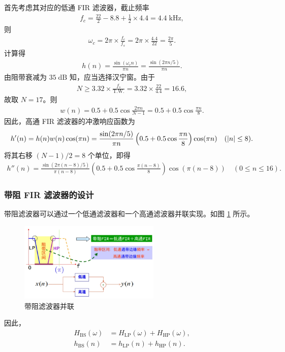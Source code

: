 \begin{solution}
    首先考虑其对应的低通 FIR 滤波器，截止频率
    \begin{align*}
        f_c = \frac{22}{2} - 8.8 + \frac{1}{2} \times 4.4 = 4.4\;\mathrm{kHz},
    \end{align*}
    则
    \begin{align*}
        \omega_c = 2\pi \times \frac{f_c}{f_s} = 2\pi \times \frac{4.4}{22} = \frac{2\pi}{5}.
    \end{align*}
    计算得
    \begin{align*}
        h(n) = \frac{\sin(\omega_c n)}{\pi n} = \frac{\sin(2\pi n / 5)}{\pi n}.
    \end{align*}
    由阻带衰减为 $35\;\mathrm{dB}$ 知，应当选择汉宁窗。由于
    \begin{align*}
        N \ge 3.32 \times \frac{f_s}{\text{T.W.}} = 3.32 \times \frac{22}{4.4} = 16.6,
    \end{align*}
    故取 $N = 17$。则
    \begin{align*}
        w(n) = 0.5 + 0.5\cos\frac{2\pi n}{N - 1} = 0.5 + 0.5\cos\frac{\pi n}{8}.
    \end{align*}
    因此，高通 FIR 滤波器的冲激响应函数为
    \begin{align*}
        h'(n) = h(n) w(n) \cos(\pi n) = \frac{\sin(2\pi n / 5)}{\pi n} \left(0.5 + 0.5\cos\frac{\pi n}{8}\right) \cos(\pi n) \quad (\left|n\right| \le 8).
    \end{align*}
    将其右移 $(N - 1) / 2 = 8$ 个单位，即得
    \begin{align*}
        h''(n) = \frac{\sin(2\pi (n - 8) / 5)}{\pi (n - 8)} \left(0.5 + 0.5\cos\frac{\pi (n - 8)}{8}\right) \cos(\pi (n - 8)) \quad (0 \le n \le 16).
    \end{align*}
\end{solution}

\subsubsection{带阻 FIR 滤波器的设计}

带阻滤波器可以通过一个低通滤波器和一个高通滤波器并联实现。如图 \ref{fig:band_stop_filter_parallel} 所示。
\begin{figure}[H]
    \centering
    \includegraphics[width=0.6\textwidth]{chap4/img/band_stop_filter_parallel.png}
    \caption{带阻滤波器并联}
    \label{fig:band_stop_filter_parallel}
\end{figure}
因此，
\begin{align*}
    H_{\text{BS}}(\omega) & = H_{\text{LP}}(\omega) + H_{\text{HP}}(\omega), \\
    h_{\text{BS}}(n) & = h_{\text{LP}}(n) + h_{\text{HP}}(n).
\end{align*}
